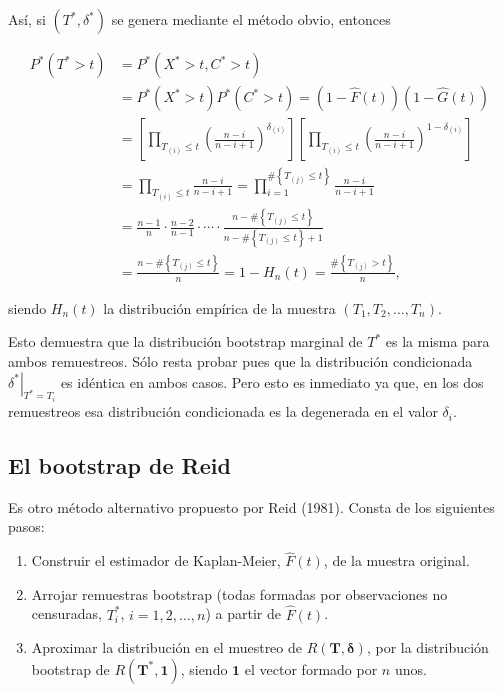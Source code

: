 \documentclass[]{book}
\theoremstyle{definition}
\theoremstyle{definition}
\theoremstyle{definition}
\theoremstyle{remark}
\begin{document}
Así, si \(\left( T^{\ast},\delta^{\ast} \right)\) se genera mediante el
método obvio, entonces

\[\begin{aligned}
P^{\ast}\left( T^{\ast}>t \right) &= P^{\ast}\left( X^{\ast}>t,C^{\ast
}>t \right) \\
&= P^{\ast}\left( X^{\ast}>t \right) P^{\ast}\left( C^{\ast}>t \right)
=\left( 1-\hat{F}\left( t \right) \right) \left( 1-\hat{G}\left( t \right)
 \right) \\
&= \left[ \prod_{T_{(i)}\leq t}\left( \frac{n-i}{n-i+1} \right)
^{\delta _{(i)}}\right] \left[ \prod_{T_{(i)}\leq
t}\left( \frac{n-i}{n-i+1} \right)^{1-\delta _{(i)}}\right] \\
&= \prod_{T_{(i)}\leq t}\frac{n-i}{n-i+1}=\prod_{i=1}^{\#\left
\{ T_{(j)}\leq t\right\} }\frac{n-i}{n-i+1} \\
&= \frac{n-1}{n}\cdot \frac{n-2}{n-1}\cdot \cdots \cdot \frac{n-\#\left\{
T_{(j)}\leq t\right\} }{n-\#\left\{ T_{(j)}\leq
t\right\} +1} \\
&= \frac{n-\#\left\{ T_{(j)}\leq t\right\} }{n}=1-H_n\left(
t \right) =\frac{\#\left\{ T_{(j)}>t\right\} }{n},\end{aligned}\]

siendo \(H_n\left( t \right)\) la distribución empírica de la muestra
\(\left( T_1,T_2,\ldots ,T_n \right)\).

Esto demuestra que la distribución bootstrap marginal de \(T^{\ast}\) es
la misma para ambos remuestreos. Sólo resta probar pues que la
distribución condicionada
\(\left. \delta^{\ast}\right\vert _{T^{\ast}=T_i}\) es idéntica en ambos
casos. Pero esto es inmediato ya que, en los dos remuestreos esa
distribución condicionada es la degenerada en el valor \(\delta _i\).

\subsection{El bootstrap de Reid}\label{el-bootstrap-de-reid}

Es otro método alternativo propuesto por Reid (1981). Consta de los
siguientes pasos:

\begin{enumerate}
\def\labelenumi{\arabic{enumi}.}
\item
  Construir el estimador de Kaplan-Meier, \(\hat{F}\left( t \right)\),
  de la muestra original.
\item
  Arrojar remuestras bootstrap (todas formadas por observaciones no
  censuradas, \(T_i^{\ast}\), \(i=1,2,\ldots ,n\)) a partir de
  \(\hat{F}\left(t \right)\).
\item
  Aproximar la distribución en el muestreo de
  \(R\left( \mathbf{T},\boldsymbol{\delta} \right)\), por la
  distribución bootstrap de
  \(R\left( \mathbf{T}^{\ast},\mathbf{1} \right)\), siendo
  \(\mathbf{1}\) el vector formado por \(n\) unos.
\end{enumerate}
\end{document}
